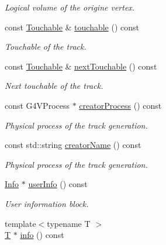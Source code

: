 \begin{DoxyCompactItemize}
\begin{DoxyCompactList}\small\item\em Logical volume of the origine vertex. \end{DoxyCompactList}\item 
const \hyperlink{class_d_d4hep_1_1_simulation_1_1_geant4_track_handler_a7db438397a8ccd838ba7bf5fe1b75bdb}{Touchable} \& \hyperlink{class_d_d4hep_1_1_simulation_1_1_geant4_track_handler_aa092449d256643f453e7339ad7fa4417}{touchable} () const
\begin{DoxyCompactList}\small\item\em Touchable of the track. \end{DoxyCompactList}\item 
const \hyperlink{class_d_d4hep_1_1_simulation_1_1_geant4_track_handler_a7db438397a8ccd838ba7bf5fe1b75bdb}{Touchable} \& \hyperlink{class_d_d4hep_1_1_simulation_1_1_geant4_track_handler_a372a2c1b761fe31bb51f29a195a787d0}{next\+Touchable} () const
\begin{DoxyCompactList}\small\item\em Next touchable of the track. \end{DoxyCompactList}\item 
const G4\+V\+Process $\ast$ \hyperlink{class_d_d4hep_1_1_simulation_1_1_geant4_track_handler_ae081ca27887a7aa012bd2df5b7eb5b98}{creator\+Process} () const
\begin{DoxyCompactList}\small\item\em Physical process of the track generation. \end{DoxyCompactList}\item 
const std\+::string \hyperlink{class_d_d4hep_1_1_simulation_1_1_geant4_track_handler_a63cf6a2e7bc4e786a3722cf9ced12cf1}{creator\+Name} () const
\begin{DoxyCompactList}\small\item\em Physical process of the track generation. \end{DoxyCompactList}\item 
\hyperlink{class_d_d4hep_1_1_simulation_1_1_geant4_track_handler_a0db29f37f6c64822f75c656ac27c03b4}{Info} $\ast$ \hyperlink{class_d_d4hep_1_1_simulation_1_1_geant4_track_handler_a66ccd67b8130fe0311e38a21699d9b72}{user\+Info} () const
\begin{DoxyCompactList}\small\item\em User information block. \end{DoxyCompactList}\item 
{\footnotesize template$<$typename T $>$ }\\\hyperlink{class_t}{T} $\ast$ \hyperlink{class_d_d4hep_1_1_simulation_1_1_geant4_track_handler_a6d21a4b708c7cb447793cd442a87997f}{info} () const

\end{DoxyCompactItemize}
